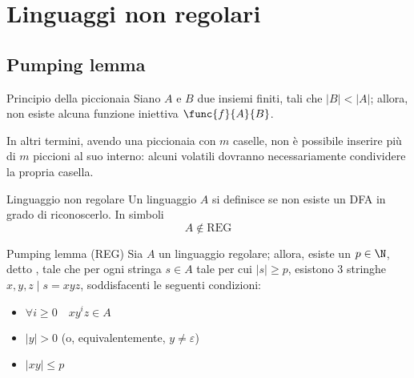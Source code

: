 \documentclass[a4paper, 12pt]{report}
\begin{document}
    \section{Linguaggi non regolari}

    \subsection{Pumping lemma}

    \begin{framedprinc}[label={pigeonhole}]{Principio della piccionaia}
        Siano $A$ e $B$ due insiemi finiti, tali che $|B| < |A|$; allora, non esiste alcuna funzione iniettiva $\func{f}{A}{B}$.

        In altri termini, avendo una piccionaia con $m$ caselle, non è possibile inserire più di $m$ piccioni al suo interno: alcuni volatili dovranno necessariamente condividere la propria casella.
    \end{framedprinc}
    
    \begin{frameddefn}{Linguaggio non regolare}
        Un linguaggio $A$ si definisce  se non esiste un DFA in grado di riconoscerlo. In simboli $$A \notin \mathrm{REG}$$
    \end{frameddefn}

    \begin{framedlem}[label={pumping reg}]{Pumping lemma (REG)}
        Sia $A$ un linguaggio regolare; allora, esiste un $p \in \N$, detto , tale che per ogni stringa $s \in A$ tale per cui $|s| \ge p$, esistono 3 stringhe $x, y, z \mid s = xyz$, soddisfacenti le seguenti condizioni:

        \begin{itemize}
            \item $\forall i \ge 0 \quad xy^iz \in A$
            \item $|y| > 0$ (o, equivalentemente, $y \neq \varepsilon$)
            \item $|xy| \le p$
        \end{itemize}
    \end{framedlem}
\end{document}

